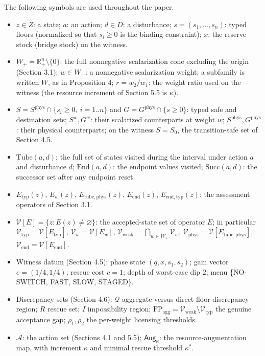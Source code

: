 \documentclass[11pt]{article}
\providecommand{\tightlist}{\setlength{\itemsep}{0pt}\setlength{\parskip}{0pt}}
\begin{document}
The following symbols are used throughout the paper.

\begin{itemize}
\tightlist
\item
  \(z \in Z\): a state; \(a\): an action; \(d \in D\): a disturbance; \(s = (s_1, \ldots, s_n)\): typed floors (normalized so that \(s_i \ge 0\) is the binding constraint); \(x\): the reserve stock (bridge stock) on the witness.
\item
  \(W_+ = \mathbb{R}^n_+ \setminus \{0\}\): the full nonnegative scalarization cone excluding the origin (Section 3.1); \(w \in W_+\): a nonnegative scalarization weight; a subfamily is written \(W\), as in Proposition 4; \(r = w_2 / w_1\): the weight ratio used on the witness (the resource increment of Section 5.5 is \(\kappa\)).
\item
  \(S = S^{\mathrm{phys}} \cap \{ s_i \ge 0,\ i = 1..n \}\) and \(G = G^{\mathrm{phys}} \cap \{ s \ge 0 \}\): typed safe and destination sets; \(S^w, G^w\): their scalarized counterparts at weight \(w\); \(S^{\mathrm{phys}}, G^{\mathrm{phys}}\): their physical counterparts; on the witness \(S = S_0\), the transition-safe set of Section 4.5.
\item
  \(\mathrm{Tube}(a,d)\): the full set of states visited during the interval under action \(a\) and disturbance \(d\); \(\mathrm{End}(a,d)\): the endpoint values visited; \(\mathrm{Succ}(a,d)\): the successor set after any endpoint reset.
\item
  \(E_{\mathrm{typ}}(z)\), \(E_w(z)\), \(E_{\mathrm{tube,phys}}(z)\), \(E_{\mathrm{end}}(z)\), \(E_{\mathrm{end,typ}}(z)\): the assessment operators of Section 3.1.
\item
  \(\mathcal{V}[E] = \{ z : E(z) \neq \varnothing \}\): the accepted-state set of operator \(E\); in particular \(\mathcal{V}_{\mathrm{typ}} = \mathcal{V}[E_{\mathrm{typ}}]\), \(\mathcal{V}_w = \mathcal{V}[E_w]\), \(\mathcal{V}_{\mathrm{weak}} = \bigcap_{w \in W_+} \mathcal{V}_w\), \(\mathcal{V}_{\mathrm{phys}} = \mathcal{V}[E_{\mathrm{tube,phys}}]\), \(\mathcal{V}_{\mathrm{end}} = \mathcal{V}[E_{\mathrm{end}}]\).
\item
  Witness datum (Section 4.5): phase state \((q, x, s_1, s_2)\); gain vector \(e = (1/4, 1/4)\); rescue cost \(c = 1\); depth of worst-case dip \(2\); menu \{NO-SWITCH, FAST, SLOW, STAGED\}.
\item
  Discrepancy sets (Section 4.6): \(\mathcal{Q}\) aggregate-versus-direct-floor discrepancy region; \(R\) rescue set; \(I\) impossibility region; \(\mathrm{FP}_{\mathrm{agg}} = \mathcal{V}_{\mathrm{weak}} \setminus \mathcal{V}_{\mathrm{typ}}\) the genuine acceptance gap; \(\rho_1, \rho_2\) the per-weight licensing thresholds.
\item
  \(\mathcal{A}\): the action set (Sections 4.1 and 5.5); \(\mathsf{Aug}_\kappa\): the resource-augmentation map, with increment \(\kappa\) and minimal rescue threshold \(\kappa^*\).
\end{itemize}
\end{document}
